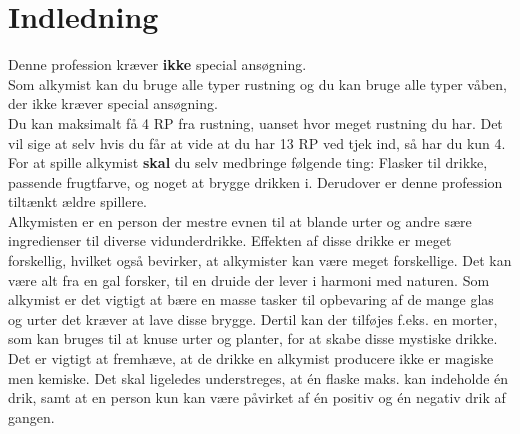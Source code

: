 
\chapter{Indledning}

Denne profession kræver \textbf{ikke} special ansøgning.\\ 
Som alkymist kan du bruge alle typer rustning og du kan bruge alle typer våben, der ikke kræver special ansøgning.\\
Du kan maksimalt få 4 RP fra rustning, uanset hvor meget rustning du har. Det vil sige at selv hvis du får at vide at du har 13 RP ved tjek ind, så har du kun 4.\\

For at spille alkymist \textbf{skal} du selv medbringe følgende ting: Flasker til drikke, passende frugtfarve, og noget at brygge drikken i. Derudover er denne profession tiltænkt ældre spillere.\\

Alkymisten er en person der mestre evnen til at blande urter og andre sære ingredienser til diverse vidunderdrikke. Effekten af disse drikke er meget forskellig, hvilket også bevirker, at alkymister kan være meget forskellige. Det kan være alt fra en gal forsker, til en druide der lever i harmoni med naturen.
Som alkymist er det vigtigt at bære en masse tasker til opbevaring af de mange glas og urter det kræver at lave disse brygge. Dertil kan der tilføjes f.eks. en morter, som kan bruges til at knuse urter og planter, for at skabe disse mystiske drikke.\\
Det er vigtigt at fremhæve, at de drikke en alkymist producere ikke er magiske men kemiske. Det skal ligeledes understreges, at én flaske maks. kan indeholde én drik, samt at en person kun kan være påvirket af én positiv og én negativ drik af gangen.\\